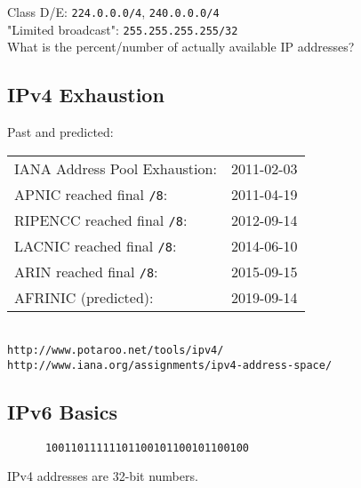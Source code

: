 \documentclass[xga]{xdvislides}
\begin{document}
Class D/E: {\tt 224.0.0.0/4}, {\tt 240.0.0.0/4}
\\

"Limited broadcast": {\tt 255.255.255.255/32}
\\

What is the percent/number of actually available IP addresses?



\subsection{IPv4 Exhaustion}
Past and predicted: \\

\begin{tabular}{l r}
IANA Address Pool Exhaustion: & 2011-02-03 \\
APNIC reached final {\tt /8}: & 2011-04-19 \\
RIPENCC reached final {\tt /8}: & 2012-09-14 \\
LACNIC reached final {\tt /8}: & 2014-06-10 \\
ARIN reached final {\tt /8}: & 2015-09-15 \\
AFRINIC (predicted): & 2019-09-14 \\
\end{tabular}
\\

\vspace{.5in}
{\tt http://www.potaroo.net/tools/ipv4/} \\
{\tt http://www.iana.org/assignments/ipv4-address-space/}

\subsection{IPv6 Basics}
\vspace{.5in}
\Hugesize
\begin{center}
\begin{verbatim}
      10011011111101100101100101100100
\end{verbatim}
\vspace{.5in}
IPv4 addresses are 32-bit numbers.
\end{center}
\Normalsize
\end{document}
